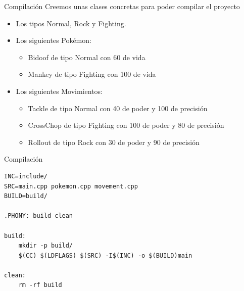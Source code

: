 \documentclass{beamer}
\begin{document}
\begin{frame}{Compilación}
    Creemos unas clases concretas para poder compilar el proyecto
    \begin{itemize}
        \item Los tipos Normal, Rock y Fighting.
        \item Los siguientes Pokémon:
        \begin{itemize}
            \item Bidoof de tipo Normal con 60 de vida
            \item Mankey de tipo Fighting con 100 de vida
        \end{itemize}
        \item Los siguientes Movimientos:
        \begin{itemize}
            \item Tackle de tipo Normal con 40 de poder y 100 de precisión
            \item CrossChop de tipo Fighting con 100 de poder y 80 de precisión
            \item Rollout de tipo Rock con 30 de poder y 90 de precisión
        \end{itemize}
    \end{itemize}
\end{frame}

\begin{frame}[fragile]{Compilación}
\begin{verbatim}
INC=include/
SRC=main.cpp pokemon.cpp movement.cpp
BUILD=build/

.PHONY: build clean

build:
    mkdir -p build/
    $(CC) $(LDFLAGS) $(SRC) -I$(INC) -o $(BUILD)main

clean:
    rm -rf build
\end{verbatim}
\end{frame}
\end{document}
